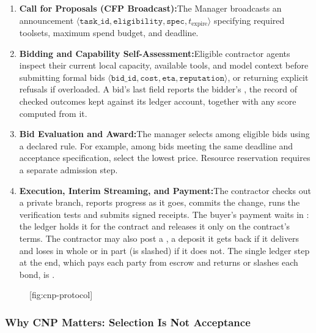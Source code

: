 \begin{enumerate}[leftmargin=1.8em,itemsep=2pt]
  \item \textbf{Call for Proposals (CFP Broadcast):}\enspace The Manager broadcasts an announcement $\langle\mathtt{task\_id}, \allowbreak \mathtt{eligibility}, \allowbreak \mathtt{spec}, \allowbreak t_{\text{expire}}\rangle$ specifying required toolsets, maximum spend budget, and deadline.
  \item \textbf{Bidding and Capability Self-Assessment:}\enspace Eligible contractor agents inspect their current local capacity, available tools, and model context before submitting formal bids $\langle\mathtt{bid\_id}, \allowbreak \mathtt{cost}, \allowbreak \mathtt{eta}, \allowbreak \mathtt{reputation}\rangle$, or returning explicit refusals if overloaded. A bid's last field reports the bidder's , the record of checked outcomes kept against its ledger account, together with any score computed from it.
  \item \textbf{Bid Evaluation and Award:}\enspace The manager selects among eligible bids using a declared rule. For example, among bids meeting the same deadline and acceptance specification, select the lowest price. Resource reservation requires a separate admission step.
  \item \textbf{Execution, Interim Streaming, and Payment:}\enspace The contractor checks out a private branch, reports progress as it goes, commits the change, runs the verification tests and submits signed receipts. The buyer's payment waits in : the ledger holds it for the contract and releases it only on the contract's terms. The contractor may also post a , a deposit it gets back if it delivers and loses in whole or in part (is slashed) if it does not. The single ledger step at the end, which pays each party from escrow and returns or slashes each bond, is .
\end{enumerate}

\begin{figure}[tp]
  \centering
  [fig:cnp-protocol]
\end{figure}


\subsubsection{Why CNP Matters: Selection Is Not Acceptance}
\label{sec:why-cnp-matters}


